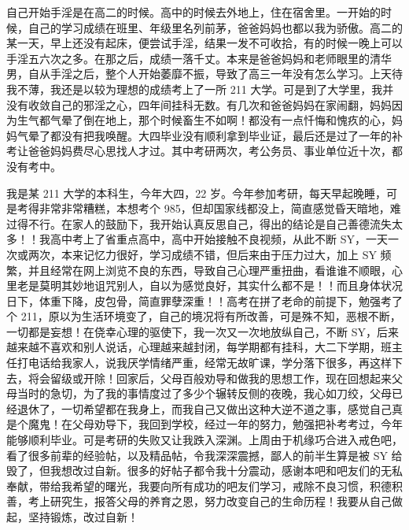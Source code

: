 \begin{case}[211]
    自己开始手淫是在高二的时候。高中的时候去外地上，住在宿舍里。一开始的时候，自己的学习成绩在班里、年级里名列前茅，爸爸妈妈也都以我为骄傲。高二的某一天，早上还没有起床，便尝试手淫，结果一发不可收拾，有的时候一晚上可以手淫五六次之多。在那之后，成绩一落千丈。本来是爸爸妈妈和老师眼里的清华男，自从手淫之后，整个人开始萎靡不振，导致了高三一年没有怎么学习。上天待我不薄，我还是以较为理想的成绩考上了一所 211 大学。可是到了大学里，我并没有收敛自己的邪淫之心，四年间挂科无数。有几次和爸爸妈妈在家闹翻，妈妈因为生气都气晕了倒在地上，那个时候畜生不如啊！都没有一点忏悔和愧疚的心，妈妈气晕了都没有把我唤醒。大四毕业没有顺利拿到毕业证，最后还是过了一年的补考让爸爸妈妈费尽心思找人才过。其中考研两次，考公务员、事业单位近十次，都没有考中。
\end{case}

\begin{case}[211]
    我是某 211 大学的本科生，今年大四，22 岁。今年参加考研，每天早起晚睡，可是考得非常非常糟糕，本想考个 985，但却国家线都没上，简直感觉昏天暗地，难过得不行。在家人的鼓励下，我开始认真反思自己，得出的结论是自己善德流失太多！！我高中考上了省重点高中，高中开始接触不良视频，从此不断 SY，一天一次或两次，本来记忆力很好，学习成绩不错，但后来由于压力过大，加上 SY 频繁，并且经常在网上浏览不良的东西，导致自己心理严重扭曲，看谁谁不顺眼，心里老是莫明其妙地诅咒别人，自以为感觉良好，其实什么都不是！！而且身体状况日下，体重下降，皮包骨，简直罪孽深重！！高考在拼了老命的前提下，勉强考了个 211，原以为生活环境变了，自己的境况将有所改善，可是殊不知，恶根不断，一切都是妄想！在侥幸心理的驱使下，我一次又一次地放纵自己，不断 SY，后来越来越不喜欢和别人说话，心理越来越封闭，每学期都有挂科，大二下学期，班主任打电话给我家人，说我厌学情绪严重，经常无故旷课，学分落下很多，再这样下去，将会留级或开除！回家后，父母百般劝导和做我的思想工作，现在回想起来父母当时的急切，为了我的事情度过了多少个辗转反侧的夜晚，我心如刀绞，父母已经退休了，一切希望都在我身上，而我自己又做出这种大逆不道之事，感觉自己真是个魔鬼！在父母劝导下，我回到学校，经过一年的努力，勉强把补考考过，今年能够顺利毕业。可是考研的失败又让我跌入深渊。上周由于机缘巧合进入戒色吧，看了很多前辈的经验帖，以及精品帖，令我深深震撼，鄙人的前半生算是被 SY 给毁了，但我想改过自新。很多的好帖子都令我十分震动，感谢本吧和吧友们的无私奉献，带给我希望的曙光，我要向所有成功的吧友们学习，戒除不良习惯，积德积善，考上研究生，报答父母的养育之恩，努力改变自己的生命历程！我要从自己做起，坚持锻炼，改过自新！
\end{case}

